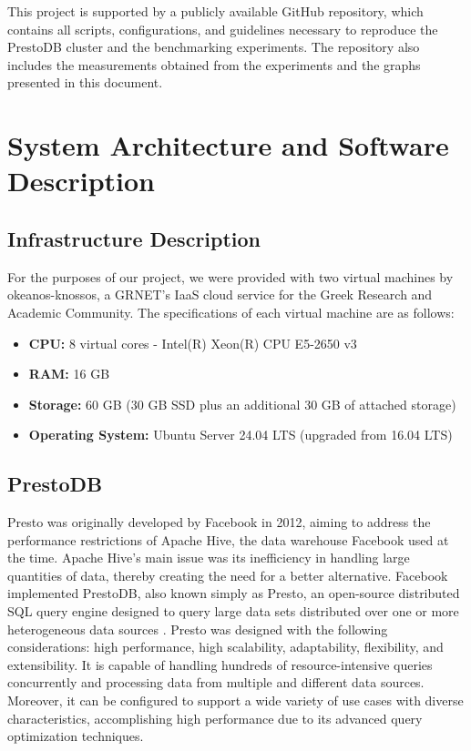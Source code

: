 \documentclass[conference]{IEEEtran}
\begin{document}
This project is supported by a publicly available GitHub repository, which contains all scripts, configurations, and guidelines necessary to reproduce the PrestoDB cluster and the benchmarking experiments. The repository also includes the measurements obtained from the experiments and the graphs presented in this document.


\section{System Architecture and Software Description}\label{SystemArchitecture}

\subsection{Infrastructure Description}

For the purposes of our project, we were provided with two virtual machines by okeanos-knossos, a GRNET's IaaS cloud service for the Greek Research and Academic Community\cite{b6}.
The specifications of each virtual machine are as follows:

\begin{itemize}
    \item \textbf{CPU:} 8 virtual cores - Intel(R) Xeon(R) CPU E5-2650 v3
    \item \textbf{RAM:} 16 GB
    \item \textbf{Storage:} 60 GB (30 GB SSD plus an additional 30 GB of attached storage)
    \item \textbf{Operating System:} Ubuntu Server 24.04 LTS (upgraded from 16.04 LTS)
\end{itemize}

\subsection{PrestoDB}
Presto was originally developed by Facebook in 2012, aiming to address the performance restrictions of Apache Hive, the data warehouse Facebook used at the time. Apache Hive’s main issue was its inefficiency in handling large quantities of data, thereby creating the need for a better alternative. Facebook implemented PrestoDB, also known simply as Presto, an open-source distributed SQL query engine designed to query large data sets distributed over one or more heterogeneous data sources \cite{b3,b4}. Presto was designed with the following considerations: high performance, high scalability, adaptability, flexibility, and extensibility. It is capable of handling hundreds of resource-intensive queries concurrently and processing data from multiple and different data sources. Moreover, it can be configured to support a wide variety of use cases with diverse characteristics, accomplishing high performance due to its advanced query optimization techniques.
\end{document}
